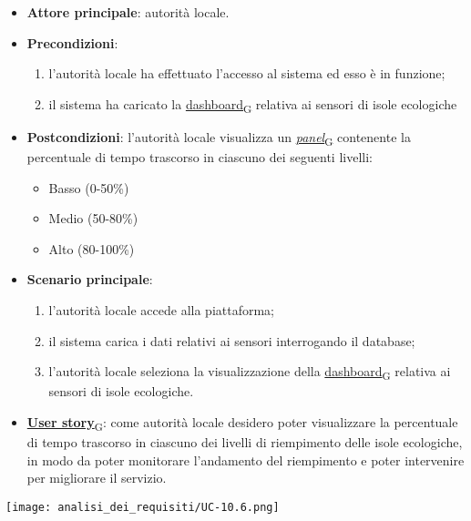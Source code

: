 \begin{itemize}
	\item \textbf{Attore principale}: autorità locale.
	\item \textbf{Precondizioni}:
	      \begin{enumerate}
		      \item l'autorità locale ha effettuato l'accesso al sistema ed esso è in funzione;
		      \item il sistema ha caricato la \href{https://7last.github.io/docs/pb/documentazione-interna/glossario\#dashboard}{dashboard\textsubscript{G}} relativa ai sensori di isole ecologiche
	      \end{enumerate}
	\item \textbf{Postcondizioni}: l'autorità locale visualizza un \href{https://7last.github.io/docs/pb/documentazione-interna/glossario\#panel}{\textit{panel}\textsubscript{G}} contenente la percentuale di tempo trascorso in ciascuno dei seguenti livelli:
	      \begin{itemize}
		      \item Basso (0-50\%)
		      \item Medio (50-80\%)
		      \item Alto (80-100\%)
	      \end{itemize}
	\item \textbf{Scenario principale}:
	      \begin{enumerate}
		      \item l'autorità locale accede alla piattaforma;
		      \item il sistema carica i dati relativi ai sensori interrogando il database;
		      \item l'autorità locale seleziona la visualizzazione della \href{https://7last.github.io/docs/pb/documentazione-interna/glossario\#dashboard}{dashboard\textsubscript{G}} relativa ai sensori di isole ecologiche.
	      \end{enumerate}
	\item \href{https://7last.github.io/docs/pb/documentazione-interna/glossario\#user-story}{\textbf{User story}\textsubscript{G}}:
	      come autorità locale desidero poter visualizzare la percentuale di tempo trascorso in ciascuno dei livelli di riempimento delle isole ecologiche,
	      in modo da poter monitorare l'andamento del riempimento e poter intervenire per migliorare il servizio.
\end{itemize}
\begin{center}
	\texttt{[image: analisi\_dei\_requisiti/UC-10.6.png]}
\end{center}

